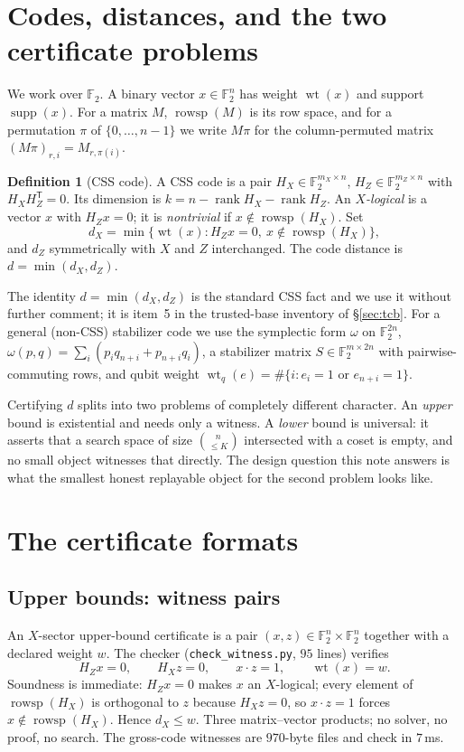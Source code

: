 \documentclass[11pt]{amsart}
\newcommand{\FF}{\mathbb{F}_{2}}
\newcommand{\rowsp}{\operatorname{rowsp}}
\newcommand{\rank}{\operatorname{rank}}
\newcommand{\wt}{\operatorname{wt}}
\newcommand{\supp}{\operatorname{supp}}
\newcommand{\HX}{H_{X}}
\newcommand{\HZ}{H_{Z}}
\newcommand{\dX}{d_{X}}
\newcommand{\dZ}{d_{Z}}
\theoremstyle{plain}
\theoremstyle{definition}
\newtheorem{definition}[theorem]{Definition}
\theoremstyle{remark}
\begin{document}
\section{Codes, distances, and the two certificate problems}\label{sec:prelim}

We work over $\FF$. A binary vector $x\in\FF^{n}$ has weight $\wt(x)$ and
support $\supp(x)$. For a matrix $M$, $\rowsp(M)$ is its row space, and for a
permutation $\pi$ of $\{0,\dots,n-1\}$ we write $M\pi$ for the
column-permuted matrix $(M\pi)_{r,i}=M_{r,\pi(i)}$.

\begin{definition}[CSS code]
A CSS code is a pair $\HX\in\FF^{m_{X}\times n}$, $\HZ\in\FF^{m_{Z}\times n}$
with $\HX\HZ^{\mathsf T}=0$. Its dimension is $k=n-\rank\HX-\rank\HZ$. An
\emph{$X$-logical} is a vector $x$ with $\HZ x=0$; it is \emph{nontrivial} if
$x\notin\rowsp(\HX)$. Set
\[
  \dX=\min\{\wt(x): \HZ x=0,\ x\notin\rowsp(\HX)\},
\]
and $\dZ$ symmetrically with $X$ and $Z$ interchanged. The code distance is
$d=\min(\dX,\dZ)$.
\end{definition}

The identity $d=\min(\dX,\dZ)$ is the standard CSS fact and we use it without
further comment; it is item~5 in the trusted-base inventory of
\S\ref{sec:tcb}. For a general (non-CSS) stabilizer code we use the symplectic
form $\omega$ on $\FF^{2n}$, $\omega(p,q)=\sum_{i}(p_{i}q_{n+i}+p_{n+i}q_{i})$,
a stabilizer matrix $S\in\FF^{m\times 2n}$ with pairwise-commuting rows, and
qubit weight $\wt_{q}(e)=\#\{i: e_{i}=1 \text{ or } e_{n+i}=1\}$.

Certifying $d$ splits into two problems of completely different character.
An \emph{upper} bound is existential and needs only a witness. A \emph{lower}
bound is universal: it asserts that a search space of size
$\binom{n}{\le K}$ intersected with a coset is empty, and no small object
witnesses that directly. The design question this note answers is what the
smallest honest replayable object for the second problem looks like.

\section{The certificate formats}\label{sec:formats}

\subsection{Upper bounds: witness pairs}\label{ssec:upper}
An $X$-sector upper-bound certificate is a pair $(x,z)\in\FF^{n}\times\FF^{n}$
together with a declared weight $w$. The checker
(\texttt{check\_witness.py}, $95$ lines) verifies
\[
  \HZ x = 0,\qquad \HX z = 0,\qquad x\cdot z = 1,\qquad \wt(x)=w .
\]
Soundness is immediate: $\HZ x=0$ makes $x$ an $X$-logical; every element of
$\rowsp(\HX)$ is orthogonal to $z$ because $\HX z=0$, so $x\cdot z=1$ forces
$x\notin\rowsp(\HX)$. Hence $\dX\le w$. Three matrix--vector products; no
solver, no proof, no search. The gross-code witnesses are $970$-byte files and
check in $7$\,ms.
\end{document}
